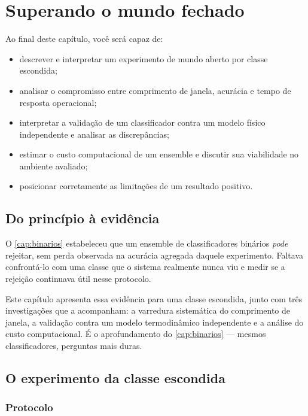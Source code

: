 \chapter{Superando o mundo fechado}
\label{cap:closedworld}

\begin{objetivos}
Ao final deste capítulo, você será capaz de:
\begin{itemize}[leftmargin=*,itemsep=0.2em]
      \item descrever e interpretar um experimento de mundo aberto por classe escondida;
  \item analisar o compromisso entre comprimento de janela, acurácia e tempo de resposta
        operacional;
  \item interpretar a validação de um classificador contra um modelo físico independente
        e analisar as discrepâncias;
  \item estimar o custo computacional de um ensemble e discutir sua viabilidade no
        ambiente avaliado;
  \item posicionar corretamente as limitações de um resultado positivo.
\end{itemize}
\end{objetivos}

\section{Do princípio à evidência}

O \cref{cap:binarios} estabeleceu que um ensemble de classificadores binários
\emph{pode} rejeitar, sem perda observada na acurácia agregada daquele experimento.
Faltava confrontá-lo com uma classe que o sistema realmente nunca viu e medir se a
rejeição continuava útil nesse protocolo.

Este capítulo apresenta essa evidência para uma classe escondida, junto com três investigações que a
acompanham: a varredura sistemática do comprimento de janela, a validação contra um
modelo termodinâmico independente e a análise do custo computacional. É o
aprofundamento do \cref{cap:binarios} --- mesmos classificadores, perguntas mais duras.

\section{O experimento da classe escondida}

\subsection{Protocolo}

